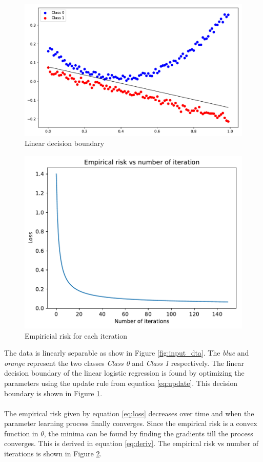 \documentclass{article}
\begin{document}
\begin{figure}[H]
    \centering
    \includegraphics[trim = 0cm 0cm 0cm 0cm,scale = 0.7]{decision.pdf}
    \caption{Linear decision boundary}
 \label{fig:decision_bound}
\end{figure}

\begin{figure}[H]
    \centering
    \includegraphics[trim = 0cm 0cm 0cm 0cm,scale = 0.8]{Risk_time.pdf}
    \caption{Empiricial risk for each iteration}
 \label{fig:risk}
\end{figure}

The data is linearly separable as show in Figure \ref{fig:input_dta}. The \textit{blue} and \textit{orange} represent the two classes \textit{Class 0} and \textit{Class 1} respectively. The linear decision boundary of the linear logistic regression is found by optimizing the parameters using the update rule from equation \ref{eq:update}. This decision boundary is shown in Figure \ref{fig:decision_bound}.\\
\\
The empirical risk given by equation \ref{eq:loss} decreases over time and when the parameter learning process finally converges. Since the empirical risk is a convex function in $\theta$, the minima can be found by finding the gradients till the process converges. This is derived in equation \ref{eq:deriv}.  The empirical risk vs number of iterations is shown in Figure \ref{fig:risk}.
\end{document}
